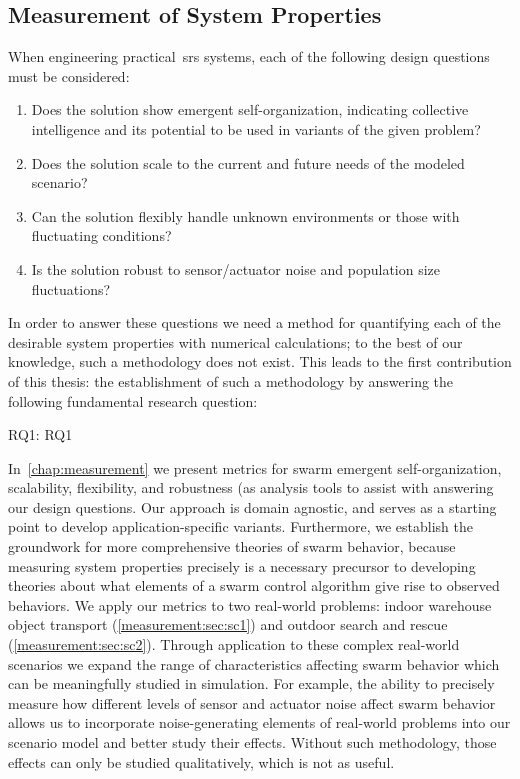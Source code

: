 \subsection{Measurement of  System Properties }
% 
When engineering practical~\gls{srs} systems, each of the following design
questions must be considered:
%
\begin{enumerate}
\item {Does the solution show emergent self-organization, indicating collective
    intelligence and its potential to be used in variants of the given problem?
  }
\item{Does the solution scale to the current and future needs of the modeled
    scenario?}
\item {Can the solution flexibly handle unknown environments or those with
    fluctuating conditions?}

\item {Is the solution robust to sensor/actuator noise and population size
    fluctuations?
  }
\end{enumerate}
%
In order to answer these questions we need a method for quantifying
each of the desirable system properties with numerical calculations; to the best
of our knowledge, such a methodology does not exist. This leads to the first
contribution of this thesis: the establishment of such a methodology by
answering the following fundamental research question:

\medskip\noindent
\gls{RQ1}: \glsdesc{RQ1}
\medskip

\noindent
In~\cref{chap:measurement} we present metrics for swarm emergent
self-organization, scalability, flexibility, and robustness (as analysis tools
to assist with answering our design questions. Our approach is domain agnostic,
and serves as a starting point to develop application-specific
variants. Furthermore, we establish the groundwork for more comprehensive
theories of swarm behavior, because measuring system properties precisely is a
necessary precursor to developing theories about what elements of a swarm
control algorithm give rise to observed behaviors. We apply our metrics to two
real-world problems: indoor warehouse object transport
(\cref{measurement:sec:sc1}) and outdoor search and rescue
(\cref{measurement:sec:sc2}).  Through application to these complex real-world
scenarios we expand the range of characteristics affecting swarm behavior which
can be meaningfully studied in simulation. For example, the ability to precisely
measure how different levels of sensor and actuator noise affect swarm behavior
allows us to incorporate noise-generating elements of real-world problems into
our scenario model and better study their effects. Without such methodology,
those effects can only be studied qualitatively, which is not as useful.

